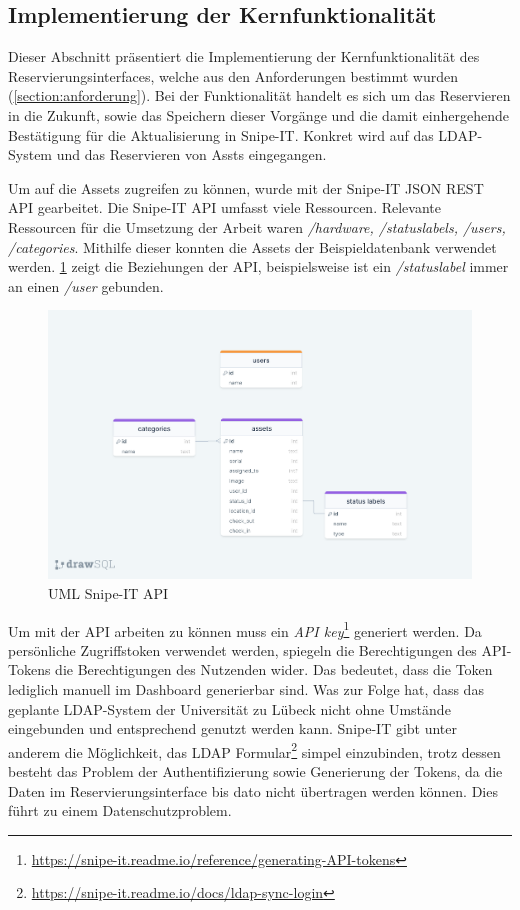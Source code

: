\subsection{Implementierung der Kernfunktionalität} 
  Dieser Abschnitt präsentiert die Implementierung der Kernfunktionalität des
  Reservierungsinterfaces, welche aus den Anforderungen bestimmt wurden (\ref{section:anforderung}).
  Bei der Funktionalität handelt es sich um das Reservieren in die Zukunft, sowie das Speichern
  dieser Vorgänge und die damit einhergehende Bestätigung für die Aktualisierung in Snipe-IT.
  Konkret wird auf das LDAP-System und das Reservieren von Assts eingegangen.

Um auf die Assets zugreifen zu können, wurde mit der Snipe-IT JSON REST API
gearbeitet. Die Snipe-IT API umfasst viele Ressourcen. Relevante Ressourcen für
die Umsetzung der Arbeit waren \textit{/hardware, /statuslabels, /users,
  /categories}. Mithilfe dieser konnten die Assets der Beispieldatenbank verwendet
werden. \ref{fig:snipe} zeigt die Beziehungen der API, beispielsweise ist ein
\textit{/statuslabel} immer an einen \textit{/user} gebunden.

\begin{figure}[h]
  \centering
  \includegraphics[scale=0.2]{Bilder/drawSQL-export-2022-10-12_17 27.png}
  \caption[UML Snipe-IT API]{UML Snipe-IT API}
  \label{fig:snipe}
\end{figure}

Um mit der API arbeiten zu können muss ein \textit{API
  key}\footnote{\url{https://snipe-it.readme.io/reference/generating-API-tokens}}
generiert werden. Da persönliche Zugriffstoken verwendet werden, spiegeln die
Berechtigungen des API-Tokens die Berechtigungen des Nutzenden wider. Das
bedeutet, dass die Token lediglich manuell im Dashboard generierbar sind. Was
zur Folge hat, dass das geplante LDAP-System der Universität zu Lübeck nicht
ohne Umstände eingebunden und entsprechend genutzt werden kann. Snipe-IT gibt
unter anderem die Möglichkeit, das LDAP
Formular\footnote{\url{https://snipe-it.readme.io/docs/ldap-sync-login}}
simpel einzubinden, trotz dessen besteht das Problem der Authentifizierung
sowie Generierung der Tokens, da die Daten im Reservierungsinterface bis dato
nicht übertragen werden können. Dies führt zu einem Datenschutzproblem.



